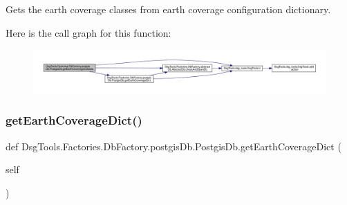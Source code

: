\begin{DoxyVerb}Gets the earth coverage classes from earth coverage configuration dictionary.
\end{DoxyVerb}
 Here is the call graph for this function\+:
\nopagebreak
\begin{figure}[H]
\begin{center}
\leavevmode
\includegraphics[width=350pt]{class_dsg_tools_1_1_factories_1_1_db_factory_1_1postgis_db_1_1_postgis_db_a2f2b99da15dfe44411c6e10c6270db24_cgraph}
\end{center}
\end{figure}
\mbox{\label{class_dsg_tools_1_1_factories_1_1_db_factory_1_1postgis_db_1_1_postgis_db_a29b23c68ed63b4d2211db3db37d0194d}} 
\subsubsection{\texorpdfstring{get\+Earth\+Coverage\+Dict()}{getEarthCoverageDict()}}
{\footnotesize\ttfamily def Dsg\+Tools.\+Factories.\+Db\+Factory.\+postgis\+Db.\+Postgis\+Db.\+get\+Earth\+Coverage\+Dict (\begin{DoxyParamCaption}\item[{}]{self }\end{DoxyParamCaption})}

